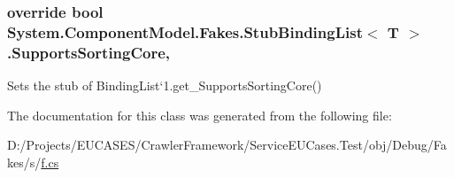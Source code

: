 \hypertarget{class_system_1_1_component_model_1_1_fakes_1_1_stub_binding_list_3_01_t_01_4_a2c88cfd098186618785537db19d22c0d}{
\subsubsection[{Supports\-Sorting\-Core}]{\setlength{\rightskip}{0pt plus 5cm}override bool System.\-Component\-Model.\-Fakes.\-Stub\-Binding\-List$<$ T $>$.Supports\-Sorting\-Core\hspace{0.3cm}{\ttfamily [get]}, {\ttfamily [protected]}}}\label{class_system_1_1_component_model_1_1_fakes_1_1_stub_binding_list_3_01_t_01_4_a2c88cfd098186618785537db19d22c0d}


Sets the stub of Binding\-List`1.get\-\_\-\-Supports\-Sorting\-Core()



The documentation for this class was generated from the following file\-:\begin{DoxyCompactItemize}
\item 
D\-:/\-Projects/\-E\-U\-C\-A\-S\-E\-S/\-Crawler\-Framework/\-Service\-E\-U\-Cases.\-Test/obj/\-Debug/\-Fakes/s/\hyperlink{s_2f_8cs}{f.\-cs}\end{DoxyCompactItemize}

